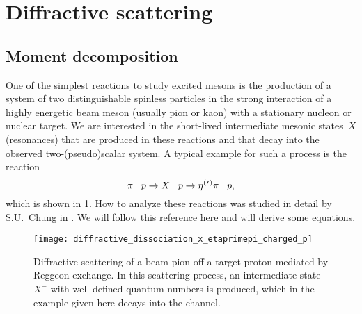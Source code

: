 \section{Diffractive scattering}%
\label{sec:diffraction}

\subsection{Moment decomposition}%
\label{sec:diffraction:moment}

One of the simplest reactions to study excited mesons is the
production of a system of two distinguishable spinless particles in
the strong interaction of a highly energetic beam meson (usually
pion or kaon) with a stationary nucleon or nuclear target.  We are
interested in the short-lived intermediate mesonic states~$X$
(resonances) that are produced in these reactions and that decay into
the observed two-(pseudo)scalar system.  A typical example for such a
process is the reaction
\begin{equation}
  \pi^-\, p \to X^-\, p \to \etaOrPrPim\, p,
\end{equation}
which is shown in \cref{fig:diffraction_etaprimepi}.  How to analyze
these reactions was studied in detail by S.U.~Chung in
.  We will follow this reference here and will
derive some equations.

\begin{figure}[bp]
  \centering%
  \texttt{[image: diffractive\_dissociation\_x\_etaprimepi\_charged\_p]}%
  \caption{Diffractive scattering of a beam pion off a target proton
  mediated by Reggeon exchange.  In this scattering process, an
  intermediate state~$X^-$ with well-defined quantum numbers is
  produced, which in the example given here decays into the
  \etaOrPrPim channel.}%
  \label{fig:diffraction_etaprimepi}%
\end{figure}

